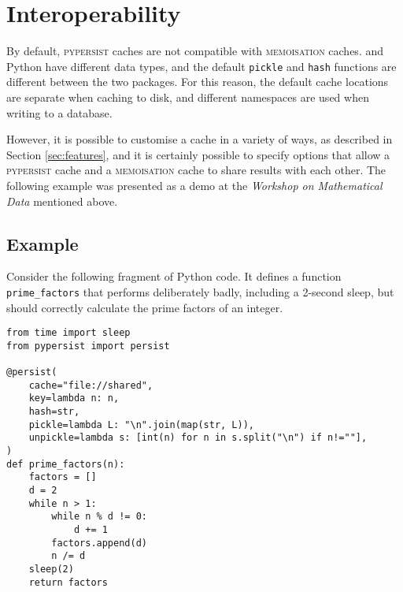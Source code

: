 \documentclass{deliverablereport}
\newcommand{\pypersist}{\textsc{pypersist}}
\newcommand{\Memoisation}{\textsc{memoisation}}
\begin{document}

\section{Interoperability}
\label{sec:cross-system}

By default, \pypersist{} caches are not compatible with \Memoisation{} caches.
\GAP and Python have different data types, and the default \texttt{pickle} and
\texttt{hash} functions are different between the two packages.  For this
reason, the default cache locations are separate when caching to disk, and
different namespaces are used when writing to a database.

However, it is possible to customise a cache in a variety of ways, as described
in Section \ref{sec:features}, and it is certainly possible to specify options
that allow a \pypersist{} cache and a \Memoisation{} cache to share results with
each other.  The following example was presented as a demo at the
\textit{Workshop on Mathematical Data} mentioned above.

\subsection{Example}
\label{sec:cross-system-example}

Consider the following fragment of Python code.  It defines a function
\texttt{prime\_factors} that performs deliberately badly, including a 2-second
sleep, but should correctly calculate the prime factors of an integer.

{\tiny
\begin{verbatim}
from time import sleep
from pypersist import persist

@persist(
    cache="file://shared",
    key=lambda n: n,
    hash=str,
    pickle=lambda L: "\n".join(map(str, L)),
    unpickle=lambda s: [int(n) for n in s.split("\n") if n!=""],
)
def prime_factors(n):
    factors = []
    d = 2
    while n > 1:
        while n % d != 0:
            d += 1
        factors.append(d)
        n /= d
    sleep(2)
    return factors
\end{verbatim}
}
\end{document}
